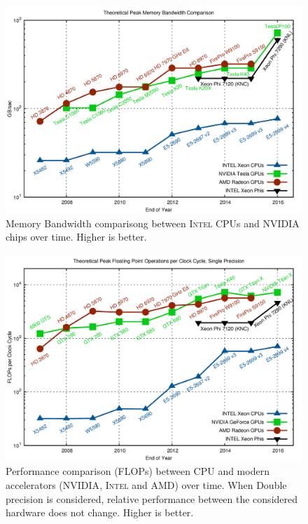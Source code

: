 \begin{description}
    \begin{figure}[!htbp]
    	\centering
    	\includegraphics[width=1.0\textwidth]{./images/parallel_programming/memory-bandwidth}
    	\caption[\textsc{Intel} CPUs and \textsc{NVIDIA} GPUs memory bandwidth
    		chart]{Memory Bandwidth comparisong between \textsc{Intel} CPUs and \textsc{NVIDIA} chips over time. Higher is better.}
    		\label{CPU-VS-GPU_MEMORY}
    \end{figure}
    \begin{figure}[!htbp]
    	\centering
    	\includegraphics[width=1.0\textwidth]{./images/parallel_programming/cpu-vs-gpu}
    	\caption[Performance comparison (FLOPs) between CPU and modern accelerators (\textsc{NVIDIA}, \textsc{Intel} and \textsc{AMD})]{Performance comparison (FLOPs) between CPU and modern accelerators (\textsc{NVIDIA}, \textsc{Intel} and \textsc{AMD}) over time. When Double precision is considered, relative performance between the considered hardware does not change. Higher is better.}\label{CPU-VS-GPU_GFLOP}

\end{figure}
\end{description}
